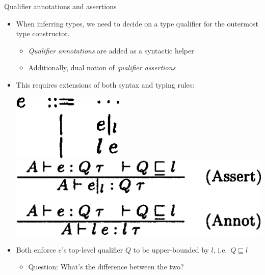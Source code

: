 \documentclass{beamer}
\begin{document}
\begin{frame}{Qualifier annotations and assertions}
  \begin{itemize}
  \item When inferring types, we need to decide on a type qualifier for the outermost type constructor.
    \begin{itemize}
    \item \emph{Qualifier annotations} are added as a syntactic helper
    \item Additionally, dual notion of \emph{qualifier assertions}
    \end{itemize}
  \item This requires extensions of both syntax and typing rules:
    \begin{center}
    \includegraphics[scale=0.3]{paper_qualifierannass_syntax.png}
    \hspace{1em}\vrule\hspace{1em}
    \includegraphics[scale=0.3]{paper_samplelang_annasstyping.png}
    \end{center}
  \item<2-> Both enforce $e$'s top-level qualifier $Q$ to be upper-bounded by $l$, i.e.\ $Q \sqsubseteq l$
    \begin{itemize}
    \item Question: What's the difference between the two?
    \end{itemize}
  \end{itemize}
\end{frame}
\end{document}
